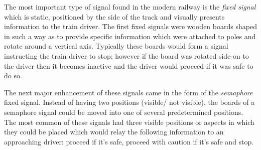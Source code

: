 \begin{comment}
Prior to the days of fixed signals, Policemen would be stationed at
junctions and railway stations. They changed points manually and gave instructions to train drivers
by using a system of either flags or oil lamps depending on the
visibility. Since this was before the time of telecommunications and
electricity there was no way of telling where a train was once it left a
station and went out of sight. The only safety precaution that could be taken
was to use an egg timer to delay the departure of the next train in order to
give the previous train time to progress along the track. Train speeds were
not very high during this period so this was an acceptable way of ensuring safety.
\end{comment}


The most important type of signal found in the modern railway is the \emph{fixed signal} which is static, positioned by the side of the track and visually presents information to the train driver. The first fixed signals were wooden boards shaped in such a way as to provide specific information which were attached to poles and rotate around a vertical axis. Typically these boards would form a signal instructing the train driver to stop; however if the board was rotated side-on to the driver then it becomes inactive and the driver would proceed if it was safe to do so.

\begin{comment}
Modern railway signally makes use of \textbf{fixed signals}. These are permanently positioned
by the side of the track and provide some visual information to the train driver.
The original fixed signal consisted of a shaped wooden board that could be
rotated on pole round a vertical axis. If the board was visible to the driver
then he would have to stop the train. On the other hand if the driver couldn't
see the board because it was side-on to him then he would be able to
proceed.
\end{comment}

The next major enhancement of these signals came in the form of the \emph{semaphore} fixed signal.  Instead of having two positions (visible/ not visible), the boards of a semaphore signal could be moved into one of several predetermined positions. The most common of these signals had three visible positions or aspects in which they could be placed which would relay the following information to an approaching driver: proceed if it's safe, proceed with caution if it's safe and stop.

